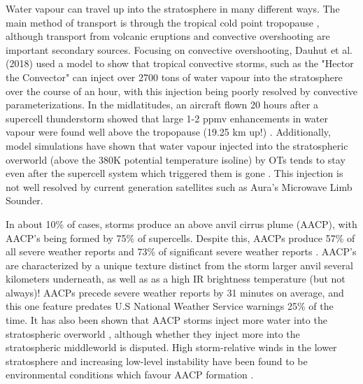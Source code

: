 \documentclass[12pt]{article}
\begin{document}
Water vapour can travel up into the stratosphere in many different ways. The main method of transport is through the tropical cold point tropopause \cite{keeble_evaluating_2021}, although transport from volcanic eruptions \cite{millan_hunga_2022} and convective overshooting are important secondary sources. Focusing on convective overshooting, Dauhut et al. (2018) \cite{dauhut_mechanisms_2018} used a model to show that tropical convective storms, such as the "Hector the Convector" can inject over 2700 tons of water vapour into the stratosphere over the course of an hour, with this injection being poorly resolved by convective parameterizations. In the midlatitudes, an aircraft flown 20 hours after a supercell thunderstorm showed that large 1-2 ppmv enhancements in water vapour were found well above the tropopause (19.25 km up!) \cite{homeyer_extreme_2023}. Additionally, model simulations have shown that water vapour injected into the stratospheric overworld (above the 380K potential temperature isoline) by OTs tends to stay even after the supercell system which triggered them is gone \cite{wang_convectively_2023}. This injection is not well resolved by current generation satellites such as Aura's Microwave Limb Sounder.

In about 10\% of cases, storms produce an above anvil cirrus plume (AACP), with AACP's being formed by 75\% of supercells. Despite this, AACPs produce 57\% of all severe weather reports and 73\% of significant severe weather reports \cite{bedka_above-anvil_2018}. AACP's are characterized by a unique texture distinct from the storm larger anvil several kilometers underneath, as well as as a high IR brightness temperature (but not always)! AACPs precede severe weather reports by 31 minutes on average, and this one feature predates  U.S National Weather Service warnings 25\% of the time. It has also been shown that AACP storms inject more water into the stratospheric overworld \cite{oneill_hydraulic_2021} \cite{gordon_sensitivities_2022} \cite{homeyer_development_2017}, although whether they inject more into the stratospheric middleworld is disputed. High storm-relative winds in the lower stratosphere and increasing low-level instability have been found to be environmental conditions which favour AACP formation \cite{homeyer_development_2017}.
\end{document}
